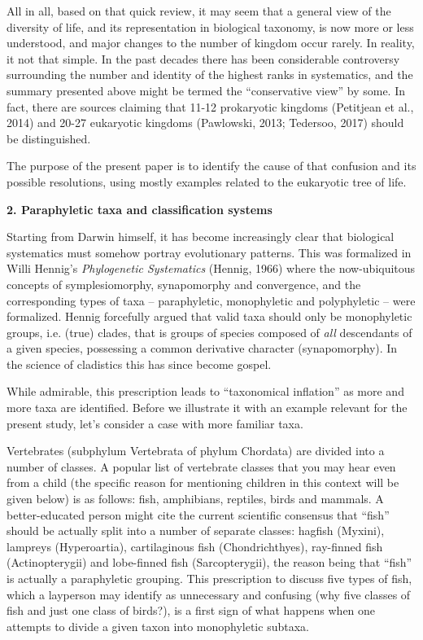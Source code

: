 \documentclass[a4paper]{article}
\begin{document}
All in all, based on that quick review, it may seem that a general view of the diversity of life, and its representation
in biological taxonomy, is now more or less understood, and major changes to the number of kingdom occur rarely. In
reality, it not that simple. In the past decades there has been considerable controversy surrounding the number and
identity of the highest ranks in systematics, and the summary presented above might be termed the “conservative view”
by some. In fact, there are sources claiming that 11-12 prokaryotic kingdoms \label{ref:RNDXxF0Lm1b0k}(Petitjean et
al., 2014) and 20-27 eukaryotic kingdoms \label{ref:RNDB4YmCpjg7j}(Pawlowski, 2013; Tedersoo, 2017) should be
distinguished.

The purpose of the present paper is to identify the cause of that confusion and its possible resolutions, using mostly
examples related to the eukaryotic tree of life.

{\bfseries
2. Paraphyletic taxa and classification systems}

Starting from Darwin himself, it has become increasingly clear that biological systematics must somehow portray
evolutionary patterns. This was formalized in Willi Hennig’s \textit{Phylogenetic Systematics}
\label{ref:RNDWJhbleZaU4}(Hennig, 1966) where the now-ubiquitous concepts of symplesiomorphy, synapomorphy and
convergence, and the corresponding types of taxa – paraphyletic, monophyletic and polyphyletic – were formalized.
Hennig forcefully argued that valid taxa should only be monophyletic groups, i.e. (true) clades, that is groups of
species composed of \textit{all} descendants of a given species, possessing a common derivative character
(synapomorphy). In the science of cladistics this has since become gospel.

While admirable, this prescription leads to “taxonomical inflation” as more and more taxa are identified. Before we
illustrate it with an example relevant for the present study, let’s consider a case with more familiar taxa.

Vertebrates (subphylum Vertebrata of phylum Chordata) are divided into a number of classes. A popular list of vertebrate
classes that you may hear even from a child (the specific reason for mentioning children in this context will be given
below) is as follows: fish, amphibians, reptiles, birds and mammals. A better-educated person might cite the current
scientific consensus that “fish” should be actually split into a number of separate classes: hagfish (Myxini), lampreys
(Hyperoartia), cartilaginous fish (Chondrichthyes), ray-finned fish (Actinopterygii) and lobe-finned fish
(Sarcopterygii), the reason being that “fish” is actually a paraphyletic grouping. This prescription to discuss five
types of fish, which a layperson may identify as unnecessary and confusing (why five classes of fish and just one class
of birds?), is a first sign of what happens when one attempts to divide a given taxon into monophyletic subtaxa.
\end{document}
